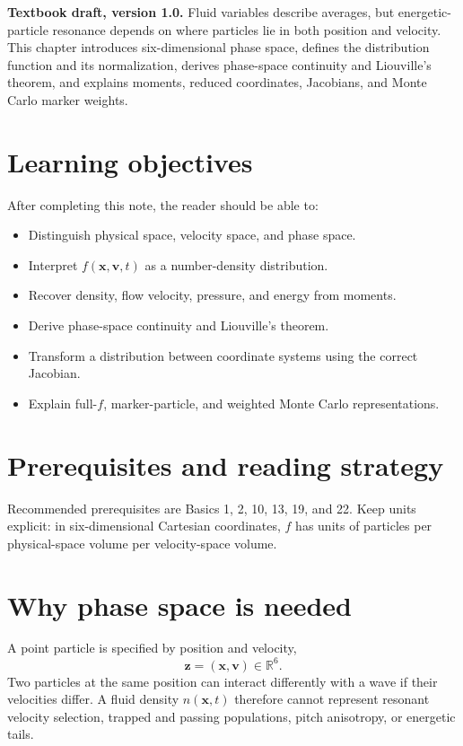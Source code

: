 \documentclass[11pt]{article}
\begin{document}

\begin{overviewbox}
\textbf{Textbook draft, version 1.0.} Fluid variables describe averages, but energetic-particle resonance depends on where particles lie in both position and velocity. This chapter introduces six-dimensional phase space, defines the distribution function and its normalization, derives phase-space continuity and Liouville's theorem, and explains moments, reduced coordinates, Jacobians, and Monte Carlo marker weights.
\end{overviewbox}

\ProjectTOC

\section{Learning objectives}
After completing this note, the reader should be able to:
\begin{itemize}[leftmargin=1.6em]
\item Distinguish physical space, velocity space, and phase space.
\item Interpret $f(\mathbf x,\mathbf v,t)$ as a number-density distribution.
\item Recover density, flow velocity, pressure, and energy from moments.
\item Derive phase-space continuity and Liouville's theorem.
\item Transform a distribution between coordinate systems using the correct Jacobian.
\item Explain full-$f$, marker-particle, and weighted Monte Carlo representations.
\end{itemize}

\section{Prerequisites and reading strategy}
Recommended prerequisites are Basics 1, 2, 10, 13, 19, and 22. Keep units explicit: in six-dimensional Cartesian coordinates, $f$ has units of particles per physical-space volume per velocity-space volume.

\section{Why phase space is needed}
A point particle is specified by position and velocity,
\begin{equation}
\mathbf z=(\mathbf x,\mathbf v)\in\mathbb R^6.
\end{equation}
Two particles at the same position can interact differently with a wave if their velocities differ. A fluid density $n(\mathbf x,t)$ therefore cannot represent resonant velocity selection, trapped and passing populations, pitch anisotropy, or energetic tails.
\end{document}

